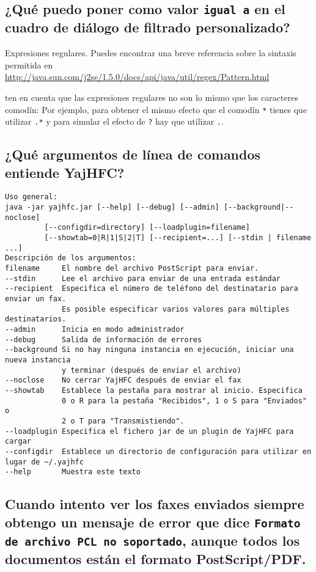 \documentclass[a4paper,10pt]{scrartcl}
\begin{document}
\subsection{¿Qué puedo poner como valor \texttt{igual a} en el cuadro de diálogo de filtrado personalizado? }

Expresiones regulares. Puedes encontrar una breve referencia sobre la sintaxis permitida en
\url{http://java.sun.com/j2se/1.5.0/docs/api/java/util/regex/Pattern.html}

ten en cuenta que las expresiones regulares no son lo mismo que los caracteres comodín:
Por ejemplo, para obtener el mismo efecto que el comodín \verb.*. tienes que utilizar \verb#.*#
y para simular el efecto de \verb#?# hay que utilizar \verb#.#.

\subsection{¿Qué argumentos de línea de comandos entiende YajHFC?}

\begin{verbatim}
Uso general:
java -jar yajhfc.jar [--help] [--debug] [--admin] [--background|--noclose]
         [--configdir=directory] [--loadplugin=filename]
         [--showtab=0|R|1|S|2|T] [--recipient=...] [--stdin | filename ...]
Descripción de los argumentos:
filename     El nombre del archivo PostScript para enviar.
--stdin      Lee el archivo para enviar de una entrada estándar
--recipient  Especifica el número de teléfono del destinatario para enviar un fax.
             Es posible especificar varios valores para múltiples destinatarios.
--admin      Inicia en modo administrador
--debug      Salida de información de errores
--background Si no hay ninguna instancia en ejecución, iniciar una nueva instancia
             y terminar (después de enviar el archivo)
--noclose    No cerrar YajHFC después de enviar el fax
--showtab    Establece la pestaña para mostrar al inicio. Especifica 
             0 o R para la pestaña "Recibidos", 1 o S para "Enviados" o
             2 o T para "Transmistiendo".
--loadplugin Especifica el fichero jar de un plugin de YajHFC para cargar
--configdir  Establece un directorio de configuración para utilizar en lugar de ~/.yajhfc
--help       Muestra este texto
\end{verbatim}


\subsection{Cuando intento ver los faxes enviados siempre obtengo un mensaje de error 
   que dice \texttt{Formato de archivo PCL no soportado}, aunque todos los documentos 
   están el formato PostScript/PDF.}
\end{document}
